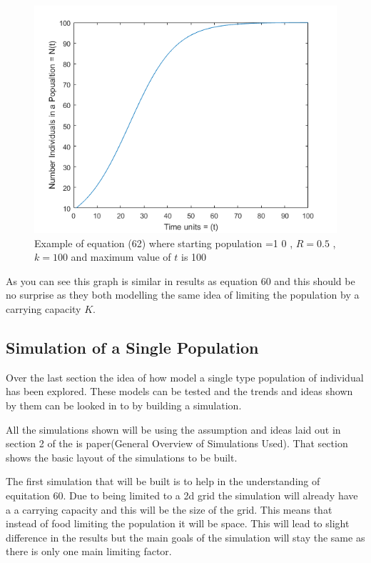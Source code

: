 \documentclass[final]{cmpreport}
\begin{document}
	\begin{figure}[h!] 
		\includegraphics[width=\textwidth]{DiscreteLogisticModel.png}
		\caption{Example of equation (62) where starting population =1 0 , $R=0.5$ , $k=100$ and maximum value of $t$ is 100}  
	\end{figure}
	
	As you can see this graph is similar in results as equation 60 and this should be no surprise as they both modelling the same idea of limiting the population by a carrying capacity $K$. 
	
	\subsection{Simulation of a Single Population}
	
	Over the last section the idea of how  model a single type population of individual has been explored. These models can be tested and the trends and ideas shown by them can be looked in to by building a simulation.
	
	All the simulations shown will be using the assumption and ideas laid out in section 2 of the is paper(General Overview of Simulations Used). That section shows the basic layout of the simulations to be built.
	
	The first simulation that will be built is to help in the understanding of equitation 60. Due to being limited to a 2d grid the simulation will already have a a carrying capacity and this will be the size of the grid. This means that instead of food limiting the population it will be space. This will lead to slight difference in the results but the main goals of the simulation will stay the same as there is only one main limiting factor. 
	 
\end{document}
